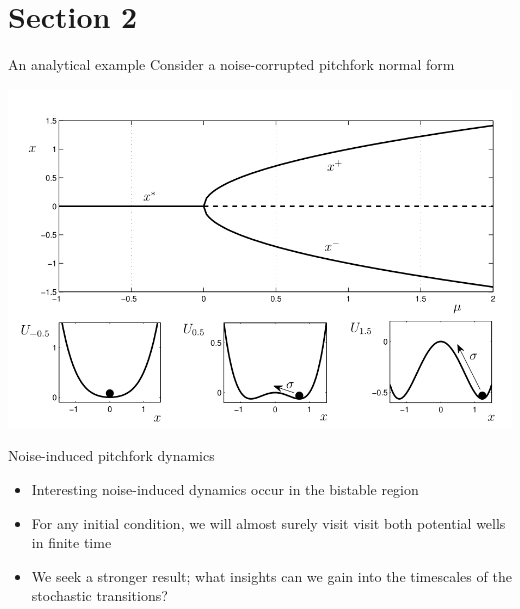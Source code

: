 \documentclass[presentation]{beamer}
\begin{document}
\section{Section 2}
\label{sec:org1f5331a}
\begin{frame}[label={sec:org909b779},plain]{An analytical example}
Consider a noise-corrupted pitchfork normal form

\begin{center}
\includegraphics[width=.9\linewidth]{./pitchfork.png}
\end{center}
\end{frame}

\begin{frame}[label={sec:orgcf9bbc8}]{Noise-induced pitchfork dynamics}
\begin{itemize}
\item Interesting noise-induced dynamics occur in the bistable region
\end{itemize}
\vfill
\begin{itemize}
\item For any initial condition, we will almost surely visit visit both potential wells in finite time
\end{itemize}
\vfill
\begin{itemize}
\item We seek a stronger result; what insights can we gain into the timescales of the stochastic transitions?
\end{itemize}
\end{frame}
\end{document}
